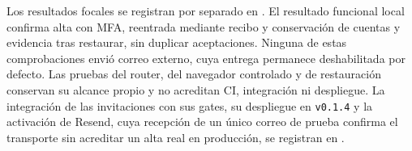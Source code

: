 Los resultados focales se registran por separado en
. El resultado funcional local confirma
alta con MFA, reentrada mediante recibo y conservaci\'on de cuentas y evidencia
tras restaurar, sin duplicar aceptaciones. Ninguna de estas comprobaciones
envi\'o correo externo, cuya entrega permanece deshabilitada por defecto. Las
pruebas del router, del navegador controlado y de restauraci\'on conservan su
alcance propio y no acreditan CI, integraci\'on ni despliegue. La integraci\'on
de las invitaciones con sus gates, su despliegue en \texttt{v0.1.4} y la
activaci\'on de Resend, cuya recepci\'on de un \'unico correo de prueba confirma
el transporte sin acreditar un alta real en producci\'on, se registran en
.
